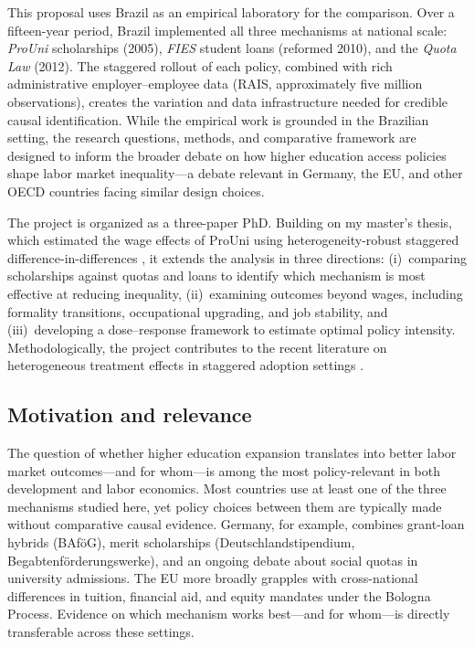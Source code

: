 \documentclass[a4paper,11pt]{article}
\begin{document}
This proposal uses Brazil as an empirical laboratory for the comparison. Over a fifteen-year period, Brazil implemented all three mechanisms at national scale: \textit{ProUni} scholarships (2005), \textit{FIES} student loans (reformed 2010), and the \textit{Quota Law} (2012). The staggered rollout of each policy, combined with rich administrative employer--employee data (RAIS, approximately five million observations), creates the variation and data infrastructure needed for credible causal identification. While the empirical work is grounded in the Brazilian setting, the research questions, methods, and comparative framework are designed to inform the broader debate on how higher education access policies shape labor market inequality---a debate relevant in Germany, the EU, and other OECD countries facing similar design choices.

The project is organized as a three-paper PhD. Building on my master's thesis, which estimated the wage effects of ProUni using heterogeneity-robust staggered difference-in-differences \citep{callaway2021}, it extends the analysis in three directions: (i)~comparing scholarships against quotas and loans to identify which mechanism is most effective at reducing inequality, (ii)~examining outcomes beyond wages, including formality transitions, occupational upgrading, and job stability, and (iii)~developing a dose--response framework to estimate optimal policy intensity. Methodologically, the project contributes to the recent literature on heterogeneous treatment effects in staggered adoption settings \citep{roth2023, dechaisemartin2020, goodmanbacon2021}.

\subsection{Motivation and relevance}

The question of whether higher education expansion translates into better labor market outcomes---and for whom---is among the most policy-relevant in both development and labor economics. Most countries use at least one of the three mechanisms studied here, yet policy choices between them are typically made without comparative causal evidence. Germany, for example, combines grant-loan hybrids (BAf\"oG), merit scholarships (Deutschlandstipendium, Begabtenf\"orderungswerke), and an ongoing debate about social quotas in university admissions. The EU more broadly grapples with cross-national differences in tuition, financial aid, and equity mandates under the Bologna Process. Evidence on which mechanism works best---and for whom---is directly transferable across these settings.
\end{document}
